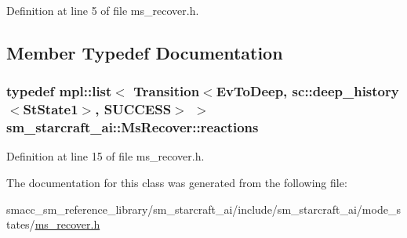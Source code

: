 Definition at line 5 of file ms\+\_\+recover.\+h.



\subsection{Member Typedef Documentation}
\subsubsection[{\texorpdfstring{reactions}{reactions}}]{\setlength{\rightskip}{0pt plus 5cm}typedef mpl\+::list$<$ Transition$<${\bf Ev\+To\+Deep}, sc\+::deep\+\_\+history$<${\bf St\+State1}$>$, {\bf S\+U\+C\+C\+E\+SS}$>$ $>$ {\bf sm\+\_\+starcraft\+\_\+ai\+::\+Ms\+Recover\+::reactions}}\hypertarget{classsm__starcraft__ai_1_1MsRecover_ae8eb85a5831f96fb0699cad678eceb26}{}\label{classsm__starcraft__ai_1_1MsRecover_ae8eb85a5831f96fb0699cad678eceb26}


Definition at line 15 of file ms\+\_\+recover.\+h.



The documentation for this class was generated from the following file\+:\begin{DoxyCompactItemize}
\item 
smacc\+\_\+sm\+\_\+reference\+\_\+library/sm\+\_\+starcraft\+\_\+ai/include/sm\+\_\+starcraft\+\_\+ai/mode\+\_\+states/\hyperlink{sm__starcraft__ai_2include_2sm__starcraft__ai_2mode__states_2ms__recover_8h}{ms\+\_\+recover.\+h}\end{DoxyCompactItemize}
